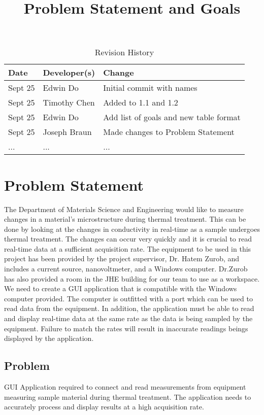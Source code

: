 \documentclass[12pt, titlepage]{article}
\title{Problem Statement and Goals\\\progname}
\author{\authname}
\date{}
\begin{document}
\maketitle

\begin{table}[hp]
\caption{Revision History} \label{TblRevisionHistory}
\begin{tabularx}{\textwidth}{llX}
\toprule
\textbf{Date} & \textbf{Developer(s)} & \textbf{Change}\\
\midrule
Sept 25 & Edwin Do & Initial commit with names\\
Sept 25 & Timothy Chen & Added to 1.1 and 1.2 \\
Sept 25 & Edwin Do & Add list of goals and new table format\\
Sept 25 & Joseph Braun & Made changes to Problem Statement \\
... & ... & ...\\
\bottomrule
\end{tabularx}
\end{table}

\section{Problem Statement}
The Department of Materials Science and Engineering would like to measure changes in a material's microstructure
during thermal treatment. This can be done by looking at the changes in conductivity in real-time as a sample undergoes 
thermal treatment. The changes can occur very quickly and it is crucial to read real-time data at a sufficient acquisition rate.
The equipment to be used in this project has been provided by the project supervisor, Dr. Hatem Zurob, and includes a current source, nanovoltmeter, and a Windows computer. 
Dr.Zurob has also provided a room in the JHE building for our team to use as a workspace. 
We need to create a GUI application that is compatible with the Windows computer provided.
The computer is outfitted with a port which can be used to read data from the equipment.
In addition, the application must be able to read and display real-time data at the same rate as the data is being sampled by the equipment. Failure to match the rates will result in inaccurate readings beings displayed by the application.

\subsection{Problem}
GUI Application required to connect and read measurements from equipment measuring sample material during thermal treatment.
The application needs to accurately process and display results at a high acquisition rate.
\end{document}
